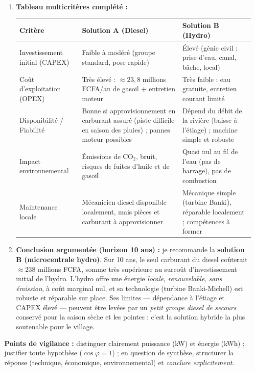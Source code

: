 \documentclass[11pt]{article}
\begin{document}
\begin{corrige}
\begin{enumerate}
\item \textbf{Tableau multicritères complété :}
\begin{center}
\begin{tabularx}{\linewidth}{|l|X|X|}\hline
\rowcolor{popblueL} Critère & Solution A (Diesel) & Solution B (Hydro) \\ \hline
Investissement initial (CAPEX) & Faible à modéré (groupe standard, pose rapide) & Élevé (génie civil : prise d'eau, canal, bâche, local) \\ \hline
Coût d'exploitation (OPEX) & Très élevé : $\approx 23,8$ millions FCFA/an de gasoil + entretien moteur & Très faible : eau gratuite, entretien courant limité \\ \hline
Disponibilité / Fiabilité & Bonne si approvisionnement en carburant assuré (piste difficile en saison des pluies) ; pannes moteur possibles & Dépend du débit de la rivière (baisse à l'étiage) ; machine simple et robuste \\ \hline
Impact environnemental & Émissions de CO$_2$, bruit, risques de fuites d'huile et de gasoil & Quasi nul au fil de l'eau (pas de barrage), pas de combustion \\ \hline
Maintenance locale & Mécanicien diesel disponible localement, mais pièces et carburant à approvisionner & Mécanique simple (turbine Banki), réparable localement ; compétences à former \\ \hline
\end{tabularx}
\end{center}

\item \textbf{Conclusion argumentée (horizon 10 ans) :} je recommande la \textbf{solution B (microcentrale hydro)}. Sur 10 ans, le seul carburant du diesel coûterait $\approx 238$ millions FCFA, somme très supérieure au surcoût d'investissement initial de l'hydro. L'hydro offre une énergie \emph{locale, renouvelable, sans émission}, à coût marginal nul, et sa technologie (turbine Banki-Michell) est robuste et réparable sur place. Ses limites — dépendance à l'étiage et CAPEX élevé — peuvent être levées par un \emph{petit groupe diesel de secours} conservé pour la saison sèche et les pointes : c'est la solution hybride la plus soutenable pour le village.
\end{enumerate}

\textbf{Points de vigilance :} distinguer clairement puissance (kW) et énergie (kWh) ; justifier toute hypothèse ($\cos\varphi = 1$) ; en question de synthèse, structurer la réponse (technique, économique, environnemental) et \emph{conclure explicitement}.
\end{corrige}
\end{document}
